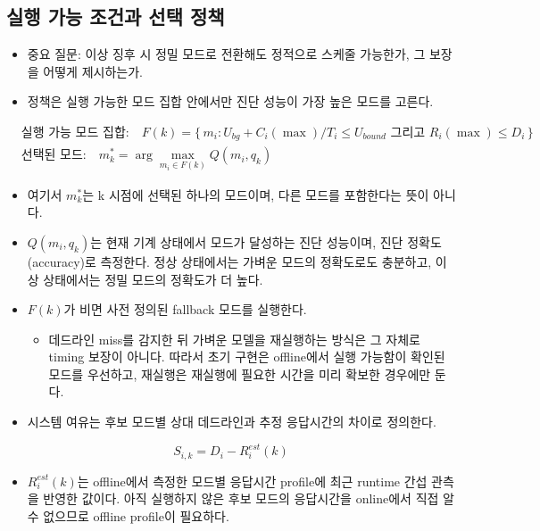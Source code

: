 \documentclass[10pt]{article}
\begin{document}
\subsection{실행 가능 조건과 선택 정책}
\begin{itemize}
\item 중요 질문: 이상 징후 시 정밀 모드로 전환해도 정적으로 스케줄 가능한가, 그 보장을 어떻게 제시하는가.
\item 정책은 실행 가능한 모드 집합 안에서만 진단 성능이 가장 높은 모드를 고른다.
\end{itemize}
\begin{align*}
&\text{실행 가능 모드 집합:}\quad F(k) = \{\, m_i : U_{bg} + C_i(\max)/T_i \le U_{bound} \text{ 그리고 } R_i(\max) \le D_i \,\} \\
&\text{선택된 모드:}\quad m^{*}_k = \arg\max_{m_i \in F(k)} Q(m_i, q_k)
\end{align*}
\begin{itemize}
\item 여기서 $m^{*}_k$는 k 시점에 선택된 하나의 모드이며, 다른 모드를 포함한다는 뜻이 아니다.
\item $Q(m_i, q_k)$는 현재 기계 상태에서 모드가 달성하는 진단 성능이며, 진단 정확도(accuracy)로 측정한다. 정상 상태에서는 가벼운 모드의 정확도로도 충분하고, 이상 상태에서는 정밀 모드의 정확도가 더 높다.
\item $F(k)$가 비면 사전 정의된 fallback 모드를 실행한다.
\begin{itemize}
\item 데드라인 miss를 감지한 뒤 가벼운 모델을 재실행하는 방식은 그 자체로 timing 보장이 아니다. 따라서 초기 구현은 offline에서 실행 가능함이 확인된 모드를 우선하고, 재실행은 재실행에 필요한 시간을 미리 확보한 경우에만 둔다.
\end{itemize}
\item 시스템 여유는 후보 모드별 상대 데드라인과 추정 응답시간의 차이로 정의한다.
\end{itemize}
\[ S_{i,k}=D_i-R_i^{est}(k) \]
\begin{itemize}
\item $R_i^{est}(k)$는 offline에서 측정한 모드별 응답시간 profile에 최근 runtime 간섭 관측을 반영한 값이다. 아직 실행하지 않은 후보 모드의 응답시간을 online에서 직접 알 수 없으므로 offline profile이 필요하다.
\end{itemize}
\end{document}

